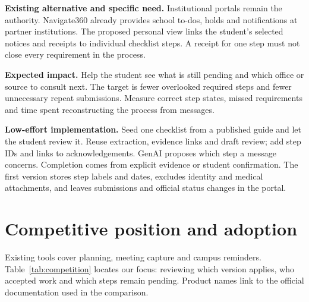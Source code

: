 \documentclass[11pt,a4paper]{article}
\begin{document}
\textbf{Existing alternative and specific need.} Institutional portals remain
the authority. Navigate360 already provides school to-dos, holds and
notifications at partner institutions. The proposed personal view links the
student's selected notices and receipts to individual checklist steps. A receipt
for one step must not close every requirement in the process.

\textbf{Expected impact.} Help the student see what is still pending and which
office or source to consult next. The target is fewer overlooked required steps
and fewer unnecessary repeat submissions. Measure correct step states, missed
requirements and time spent reconstructing the process from messages.

\textbf{Low-effort implementation.} Seed one checklist from a published guide
and let the student review it. Reuse extraction, evidence links and draft review;
add step IDs and links to acknowledgements. GenAI proposes which step a message
concerns. Completion comes from explicit evidence or student confirmation. The
first version stores step labels and dates, excludes identity and medical
attachments, and leaves submissions and official status changes in the portal.

\clearpage
\section{Competitive position and adoption}
Existing tools cover planning, meeting capture and campus reminders.
Table~\ref{tab:competition} locates our focus: reviewing which version applies,
who accepted work and which steps remain pending. Product names link to the
official documentation used in the comparison.
\end{document}
